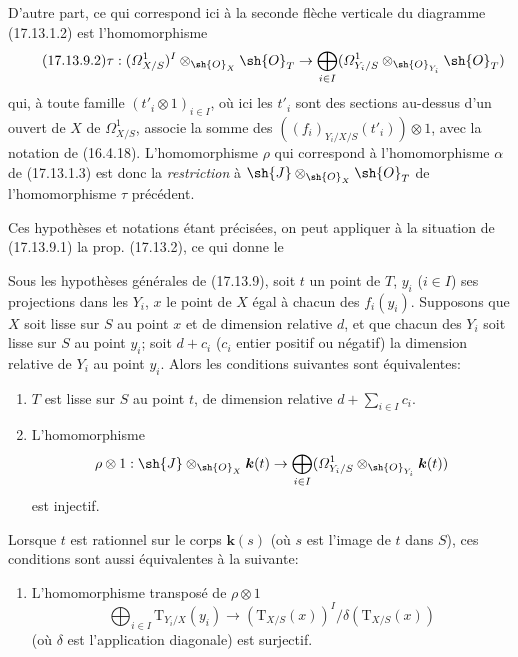 \begin{env}[17.13.9]
D'autre part, ce qui correspond ici à la seconde flèche verticale du diagramme (17.13.1.2) est l'homomorphisme
\[
\label{IV.17.13.9.2}
\tag{17.13.9.2}
\tau:(\varOmega^1_{X/S})^I\otimes_{\sh{O}_X}\sh{O}_T\to\bigoplus_{i\in I}(\varOmega^1_{Y_i/S}\otimes_{\sh{O}_{Y_i}}\sh{O}_T)
\]
qui, à toute famille $(t'_i\otimes1)_{i\in I}$, où ici les $t'_i$ sont des sections au-dessus d'un ouvert de $X$ de $\varOmega^1_{X/S}$, associe la somme des $((f_i)_{Y_i/X/S}(t'_i))\otimes1$, avec la notation de (16.4.18). L'homomorphisme $\rho$ qui correspond à l'homomorphisme $\alpha$ de (17.13.1.3) est donc la \emph{restriction} à $\sh{J}\otimes_{\sh{O}_X}\sh{O}_T$ de l'homomorphisme $\tau$ précédent.

Ces hypothèses et notations étant précisées, on peut appliquer à la situation de (17.13.9.1) la prop. (17.13.2), ce qui donne le
\end{env}

\begin{corollary}[17.13.10]
Sous les hypothèses générales de \textup{(17.13.9)}, soit $t$ un point de $T$, $y_i$ \textup{($i\in I$)} ses projections dans les $Y_i$, $x$ le point de $X$ égal à chacun des $f_i(y_i)$. Supposons que $X$ soit lisse sur $S$ au point $x$ et de dimension relative $d$, et que chacun des $Y_i$ soit lisse sur $S$ au point $y_i$; soit $d+c_i$ \textup{(}$c_i$ entier positif ou négatif\textup{)} la dimension relative de $Y_i$ au point $y_i$. Alors les conditions suivantes sont équivalentes:


\begin{enumerate}
  \item[\textup{a)}] $T$ est lisse sur $S$ au point $t$, de dimension relative $d+\sum_{i\in I}c_i$.
  \item[\textup{b)}] L'homomorphisme
  \[
  \rho\otimes1:\sh{J}\otimes_{\sh{O}_X}\boldsymbol{k}(t)\to\bigoplus_{i\in I}(\varOmega^1_{Y_i/S}\otimes_{\sh{O}_{Y_i}}\boldsymbol{k}(t))
  \]
  est injectif.
\end{enumerate}

Lorsque $t$ est rationnel sur le corps $\boldsymbol{k}(s)$ \textup{(}où $s$ est l'image de $t$ dans $S$\textup{)}, ces conditions sont aussi équivalentes à la suivante:
\begin{enumerate}
  \item[\textup{b$'$)}] L'homomorphisme transposé de $\rho\otimes1$
  \[
  \bigoplus_{i\in I}\mathrm{T}_{Y_i/X}(y_i)\to(\mathrm{T}_{X/S}(x))^I/\delta(\mathrm{T}_{X/S}(x))
  \]
  (où $\delta$ est l'application diagonale) est surjectif.
\end{enumerate}
\end{corollary}


